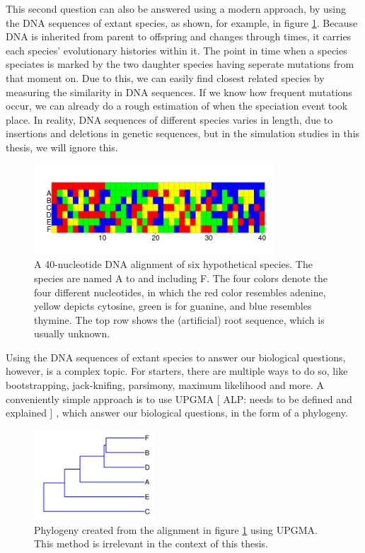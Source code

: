 This second question can also be answered 
using a modern approach, 
by using the DNA sequences of extant species,
as shown, for example, in figure \ref{fig:alignment}.
Because DNA is inherited from parent to offspring
and changes through times, it carries each species' 
evolutionary histories within it.
The point in time when a species speciates is
marked by the two daughter species having seperate mutations
from that moment on.
Due to this, we can easily find closest related species 
by measuring the similarity in DNA sequences.
If we know how frequent mutations occur, we can already
do a rough estimation of when the speciation event took place.
In reality, DNA sequences of different species 
varies in length, due to insertions and deletions in genetic sequences,
but in the simulation studies in this thesis, we will ignore this.

\begin{figure}[H]
  \includegraphics[width=0.8\textwidth]{alignment_40_with_root.png}
  \caption{
    A 40-nucleotide DNA alignment of six hypothetical species. The species
    are named A to and including F. 
    The four colors denote the four different nucleotides,
    in which the red color resembles adenine, yellow depicts cytosine, 
    green is for guanine, and blue resembles thymine. The top
    row shows the (artificial) root sequence, which is usually unknown.
  }
  \label{fig:alignment}
\end{figure}

Using the DNA sequences of extant species to answer our biological questions,
however, is a complex topic. For starters, there are multiple 
ways to do so, like bootstrapping, 
jack-knifing, parsimony, maximum likelihood and more.
A conveniently simple approach is to use UPGMA 
[
  ALP:
  needs to be defined and explained
]
, which answer our biological
questions, in the form of a phylogeny.


\begin{figure}[H]
  \includegraphics[width=0.4\textwidth]{phylogeny_40_upgma.png}
  \caption{
    Phylogeny created from the alignment in figure \ref{fig:alignment} 
    using UPGMA. 
    This method is irrelevant in the context of this thesis.
  }
  \label{fig:phylogeny_upgma}
\end{figure}

